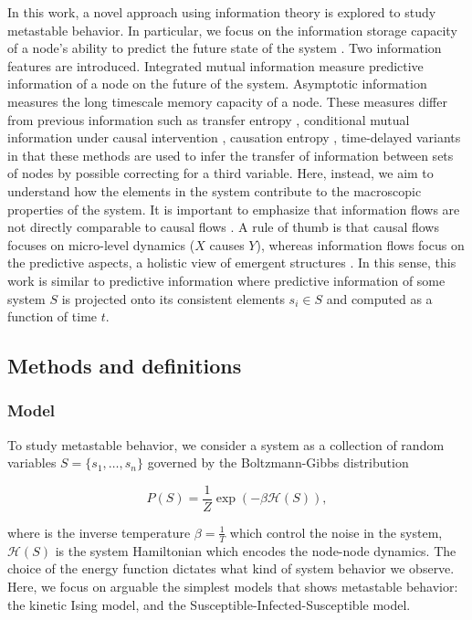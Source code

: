 \documentclass[a4paper, 11pt, twocolumn]{article}
\begin{document}
In this work,  a novel approach using  information theory is
explored  to study  metastable behavior.  In particular,  we
focus  on  the  information  storage capacity  of  a  node's
ability  to   predict  the   future  state  of   the  system
\cite{Lizier2013}.  Two information  features are  introduced.
Integrated mutual information measure predictive information
of  a  node   on  the  future  of   the  system.  Asymptotic
information measures the long timescale memory capacity of a
node. These  measures differ from previous  information such
as  transfer  entropy   \cite{Schreiber},  conditional  mutual
information under causal intervention \cite{Ay2008}, causation
entropy \cite{Runge2019}, time-delayed variants \cite{Li2008} in
that  these  methods  are  used to  infer  the  transfer  of
information between sets of nodes by possible correcting for
a third  variable. Here, instead,  we aim to  understand how
the  elements in  the system  contribute to  the macroscopic
properties of the system. It  is important to emphasize that
information  flows are  not  directly  comparable to  causal
flows \cite{James2016}. A  rule of thumb is  that causal flows
focuses  on  micro-level   dynamics  (\(X\)  causes  \(Y\)),
whereas information flows focus on the predictive aspects, a
holistic  view of  emergent  structures \cite{Lizier2013}.  In
this sense,  this work is similar  to predictive information
\cite{Bialek1999} where predictive  information of some system
\(S\) is projected onto its  consistent elements \(s_i \in S\)
and computed as a function of time \(t\).

\subsection{Methods and definitions}
\label{sec:orgc2d2248}
\subsubsection{Model}
\label{sec:org5382bb5}
To  study metastable  behavior, we  consider a  system as  a
collection of  random variables \(S =  \{s_1, \dots, s_n\}\)
governed by the Boltzmann-Gibbs distribution

\[P(S)    =     \frac{1}{Z}    \exp(- \beta \mathcal{H}(S) ),\]

where is  the inverse temperature \(\beta  = \frac{1}{T}\) which
control the  noise in the system,  \(\mathcal{H}(S)\) is the
system Hamiltonian which encodes the node-node dynamics. The
choice of the  energy function dictates what  kind of system
behavior we observe. Here, we focus on arguable the simplest
models  that shows  metastable behavior:  the kinetic  Ising
model, and the Susceptible-Infected-Susceptible model.
\end{document}
